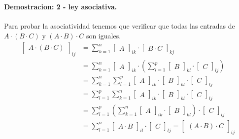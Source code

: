 \documentclass{article}
\theoremstyle{definition}
\theoremstyle{definition}
\theoremstyle{remark}
\begin{document}
\textbf{Demostracion: 2 - ley asociativa.} \\\\
Para probar la asociatividad tenemos que verificar que todas las entradas de $A\cdot(B\cdot C)$ y $(A \cdot B) \cdot C$ son iguales.\[
  \begin{aligned}
    \begin{bmatrix} A \cdot (B\cdot C) \end{bmatrix}_{ij}  
    &= \sum_{k=1}^{n}\begin{bmatrix}A\end{bmatrix}_{ik} \cdot \begin{bmatrix}B \cdot C \end{bmatrix}_{kj} \\ 
    &= \sum_{k=1}^{n}\begin{bmatrix}A\end{bmatrix}_{ik} \cdot \left(\sum_{l=1}^{p} \begin{bmatrix} B \end{bmatrix}_{kl} \cdot \begin{bmatrix}C\end{bmatrix}_{lj}\right)\\
    &= \sum_{k=1}^n \sum_{l=1}^{p} \begin{bmatrix}A \end{bmatrix}_{ik} \cdot \begin{bmatrix} B \end{bmatrix}_{kl} \cdot \begin{bmatrix} C \end{bmatrix}_{lj}\\
    &= \sum_{l=1}^{p} \sum_{k=1}^{n} \begin{bmatrix}A \end{bmatrix}_{ik} \cdot \begin{bmatrix} B \end{bmatrix}_{kl} \cdot \begin{bmatrix}C\end{bmatrix}_{lj} \\
    &= \sum_{l=1}^{p} \left(\sum_{k=1}^{n}\begin{bmatrix}A \end{bmatrix}_{ik} \cdot \begin{bmatrix} B \end{bmatrix}_{kl}\right) \cdot \begin{bmatrix} C \end{bmatrix}_{lj} \\
    &= \sum_{l=1}^{n} \begin{bmatrix}A \cdot B \end{bmatrix}_{il} \cdot \begin{bmatrix} C \end{bmatrix}_{lj} = \begin{bmatrix} (A \cdot B ) \cdot C \end{bmatrix}_{ij}\\
  \end{aligned}
\]
\end{document}
